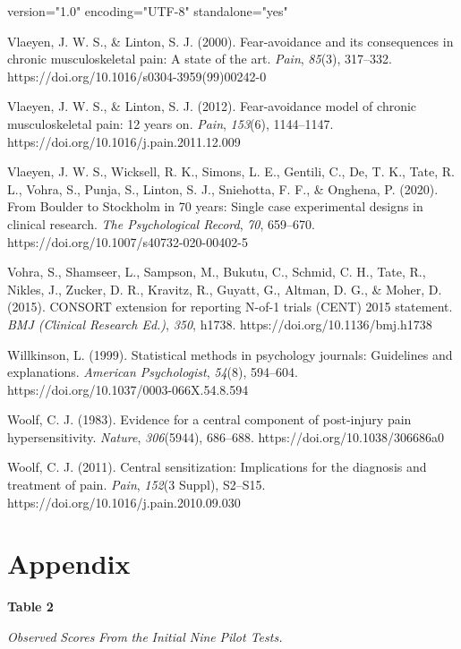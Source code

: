 version="1.0" encoding="UTF-8" standalone="yes" \documentclass{article}
\begin{document}
Vlaeyen, J. W. S., \& Linton, S. J. (2000). Fear-avoidance and its consequences in chronic musculoskeletal pain: A state of the art. \emph{Pain}, \emph{85}(3), 317--332. https://doi.org/10.1016/s0304-3959(99)00242-0

Vlaeyen, J. W. S., \& Linton, S. J. (2012). Fear-avoidance model of chronic musculoskeletal pain: 12 years on. \emph{Pain}, \emph{153}(6), 1144--1147. https://doi.org/10.1016/j.pain.2011.12.009

Vlaeyen, J. W. S., Wicksell, R. K., Simons, L. E., Gentili, C., De, T. K., Tate, R. L., Vohra, S., Punja, S., Linton, S. J., Sniehotta, F. F., \& Onghena, P. (2020). From Boulder to Stockholm in 70 years: Single case experimental designs in clinical research. \emph{The Psychological Record}, \emph{70}, 659--670. https://doi.org/10.1007/s40732-020-00402-5

Vohra, S., Shamseer, L., Sampson, M., Bukutu, C., Schmid, C. H., Tate, R., Nikles, J., Zucker, D. R., Kravitz, R., Guyatt, G., Altman, D. G., \& Moher, D. (2015). CONSORT extension for reporting N-of-1 trials (CENT) 2015 statement. \emph{BMJ (Clinical Research Ed.)}, \emph{350}, h1738. https://doi.org/10.1136/bmj.h1738

Willkinson, L. (1999). Statistical methods in psychology journals: Guidelines and explanations. \emph{American Psychologist}, \emph{54}(8), 594--604. https://doi.org/10.1037/0003-066X.54.8.594

Woolf, C. J. (1983). Evidence for a central component of post-injury pain hypersensitivity. \emph{Nature}, \emph{306}(5944), 686--688. https://doi.org/10.1038/306686a0

Woolf, C. J. (2011). Central sensitization: Implications for the diagnosis and treatment of pain. \emph{Pain}, \emph{152}(3 Suppl), S2--S15. https://doi.org/10.1016/j.pain.2010.09.030





\section{Appendix}

\textbf{Table 2}

\emph{Observed }\emph{Scores }\emph{From}\emph{ the}\emph{ }\emph{Initial Nine}\emph{ Pilot Tests.}
\end{document}
